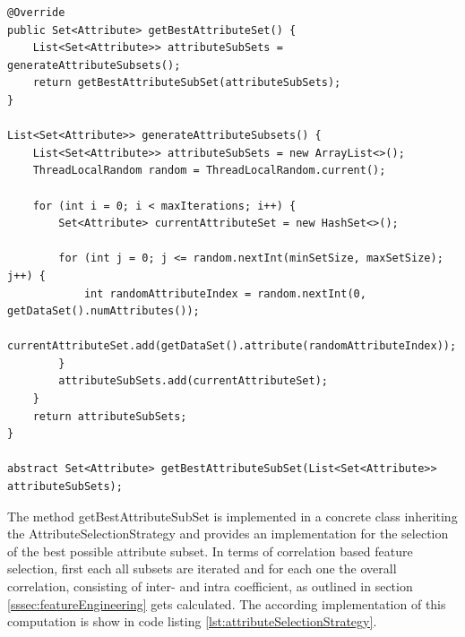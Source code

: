 \begin{lstlisting}[caption={AttributeSelectionStrategy}, label={lst:attributeSelectionStrategy}]
@Override
public Set<Attribute> getBestAttributeSet() {
	List<Set<Attribute>> attributeSubSets = generateAttributeSubsets();
	return getBestAttributeSubSet(attributeSubSets);
}

List<Set<Attribute>> generateAttributeSubsets() {
	List<Set<Attribute>> attributeSubSets = new ArrayList<>();
	ThreadLocalRandom random = ThreadLocalRandom.current();
	
	for (int i = 0; i < maxIterations; i++) {
		Set<Attribute> currentAttributeSet = new HashSet<>();
		
		for (int j = 0; j <= random.nextInt(minSetSize, maxSetSize); j++) {
			int randomAttributeIndex = random.nextInt(0, getDataSet().numAttributes());
			currentAttributeSet.add(getDataSet().attribute(randomAttributeIndex));
		}
		attributeSubSets.add(currentAttributeSet);
	}
	return attributeSubSets;
}

abstract Set<Attribute> getBestAttributeSubSet(List<Set<Attribute>> attributeSubSets);
\end{lstlisting}

The method getBestAttributeSubSet is implemented in a concrete class inheriting the AttributeSelectionStrategy and provides an implementation for the selection of the best possible attribute subset. In terms of correlation based feature selection, first each all subsets are iterated and for each one the overall correlation, consisting of inter- and intra coefficient, as outlined in section \ref{sssec:featureEngineering} gets calculated. The according implementation of this computation is show in code listing \ref{lst:attributeSelectionStrategy}. 

